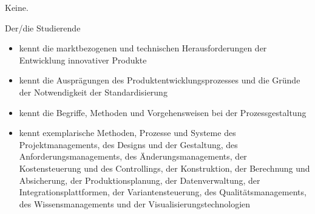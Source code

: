 \begin{course}

\setdoclanguagegerman
{}



\coursehead


\label{cour_8493.dp_997}


\begin{styleenv}
\begin{assessment}

\end{assessment}

\begin{conditions}Keine.\end{conditions}


\end{styleenv}

\begin{learningoutcomes}
Der/die Studierende

 \begin{itemize}\item kennt die marktbezogenen und technischen Herausforderungen der Entwicklung innovativer Produkte  \item kennt die Ausprägungen des Produktentwicklungsprozesses und die Gründe der Notwendigkeit der Standardisierung  \item kennt die Begriffe, Methoden und Vorgehensweisen bei der Prozessgestaltung  \item kennt exemplarische Methoden, Prozesse und Systeme des Projektmanagements, des Designs und der Gestaltung, des Anforderungsmanagements, des Änderungsmanagements, der Kostensteuerung und des Controllings, der Konstruktion, der Berechnung und Absicherung, der Produktionsplanung, der Datenverwaltung, der Integrationsplattformen, der Variantensteuerung, des Qualitätsmanagements, des Wissensmanagements und der Visualisierungstechnologien  \end{itemize}
\end{learningoutcomes}


\end{course}
